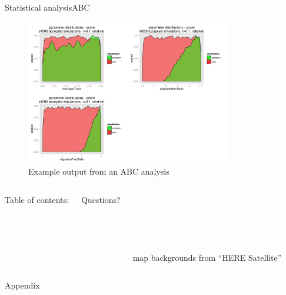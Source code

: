 \documentclass[10pt,aspectratio=43]{beamer}
\begin{document}
\begin{frame}{Statistical analysis}{ABC}
\begin{center}
  \begin{figure}
    \includegraphics[width=0.8\textwidth]{../data/abc-priors-posteriors.png}
    \caption{Example output from an ABC analysis}
  \end{figure}
\end{center}
\end{frame}


\begin{frame}[plain]
\begin{columns}
    Table of contents:\\~\\
    \tableofcontents[subsubsectionstyle=hide]

    \begin{Huge}
      Questions?
    \end{Huge}
    \\~\\~\\~\\~\\
    \color{lightgray}
    map backgrounds from “HERE Satellite”

\end{columns}
\end{frame}


\begin{frame}[noframenumbering]
Appendix
\end{frame}
\end{document}
